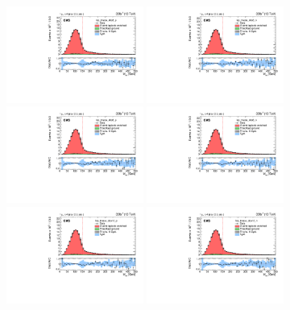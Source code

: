 \begin{figure}
    \centering
    \includegraphics[width=0.4\textwidth]{figure/FitResult_16_mu_lep_tmass_obs3_p_chi2_20.pdf}
    \includegraphics[width=0.4\textwidth]{figure/FitResult_16_mu_lep_tmass_obs3_n_chi2_20.pdf}
    \includegraphics[width=0.4\textwidth]{figure/FitResult_16_mu_lep_tmass_obs6_p_chi2_20.pdf}
    \includegraphics[width=0.4\textwidth]{figure/FitResult_16_mu_lep_tmass_obs6_n_chi2_20.pdf}
    \includegraphics[width=0.4\textwidth]{figure/FitResult_16_mu_lep_tmass_obs12_p_chi2_20.pdf}
    \includegraphics[width=0.4\textwidth]{figure/FitResult_16_mu_lep_tmass_obs12_n_chi2_20.pdf}

\end{figure}
